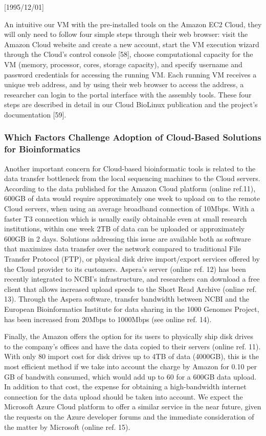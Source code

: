 \NeedsTeXFormat{LaTeX2e}[1995/12/01] \documentclass[10pt]{bmc_article}
\newenvironment{bmcformat}{\begin{raggedright}\baselineskip20pt\sloppy\setboolean{publ}{false}}{\end{raggedright}\baselineskip20pt\sloppy}
\begin{document}
\begin{bmcformat}
An intuitive \cite{youtube}
our VM with the pre-installed tools on the Amazon EC2 Cloud, they will only need to follow four simple steps
through their web browser: visit the Amazon Cloud website and create a new account, start the VM execution
wizard through the Cloud's control console [58], choose computational capacity for the VM (memory,
processor, cores, storage capacity), and specify username and password credentials for accessing the running
VM. Each running VM receives a unique web address, and by using their web browser to access the address, a
researcher can login to the portal interface with the assembly tools. These four steps are described in detail
in our Cloud BioLinux publication and the project's documentation [59].


\subsubsection*{Which Factors Challenge Adoption of Cloud-Based Solutions for Bioinformatics }

Another important concern for Cloud-based bioinformatic tools is related to the data transfer bottleneck from
the local sequencing machines to the Cloud servers.  According to the data published for the Amazon Cloud
platform (online ref.11), 600GB of data would require approximately one week to upload on to the remote Cloud
servers, when using an average broadband connection of 10Mbps. With a faster T3 connection which is usually
easily obtainable even at small research institutions, within one week 2TB of data can be uploaded or
approximately 600GB in 2 days.  Solutions addressing this issue are available both as software that maximizes
data transfer over the network compared to traditional File Transfer Protocol (FTP), or physical disk drive
import/export services offered by the Cloud provider to its customers. Aspera's server (online ref. 12) has
been recently integrated to NCBI's infrastructure, and researchers can download a free client that allows
increased upload speeds to the Short Read Archive (online ref. 13).  Through the Aspera software, transfer
bandwidth between NCBI and the European Bioinformatics Institute for data sharing in the 1000 Genomes Project,
has been increased from 20Mbps to 1000Mbps (see online ref. 14). 

Finally, the Amazon offers the option for its users to physically ship disk drives to the company's offices
and have the data copied to their servers (online ref. 11). With only 80 import cost for disk drives up to 4TB
of data (4000GB), this is the most efficient method if we take into account the charge by Amazon for 0.10 per
GB of bandwith consumed, which would add up to 60 for a 600GB data upload. In addition to that cost, the
expense for obtaining a high-bandwidth internet connection for the data upload should be taken into account.
We expect the Microsoft Azure Cloud platform to offer a similar service in the near future, given the requests
on the Azure developer forums and the immediate consideration of the matter by Microsoft (online ref. 15).




\end{bmcformat}
\end{document}
